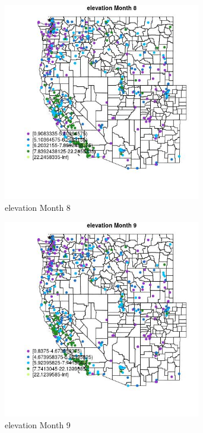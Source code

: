 \begin{figure} 
\centering  
\includegraphics[width=0.77\textwidth]{Code_Outputs/ML_input_report_ML_input_PM25_Step5_part_d_de_duplicated_aves_ML_input_MapObsMo8elevation.jpg} 
\caption{\label{fig:ML_input_report_ML_input_PM25_Step5_part_d_de_duplicated_aves_ML_inputMapObsMo8elevation}elevation Month 8} 
\end{figure} 
 

\begin{figure} 
\centering  
\includegraphics[width=0.77\textwidth]{Code_Outputs/ML_input_report_ML_input_PM25_Step5_part_d_de_duplicated_aves_ML_input_MapObsMo9elevation.jpg} 
\caption{\label{fig:ML_input_report_ML_input_PM25_Step5_part_d_de_duplicated_aves_ML_inputMapObsMo9elevation}elevation Month 9} 
\end{figure} 
 

